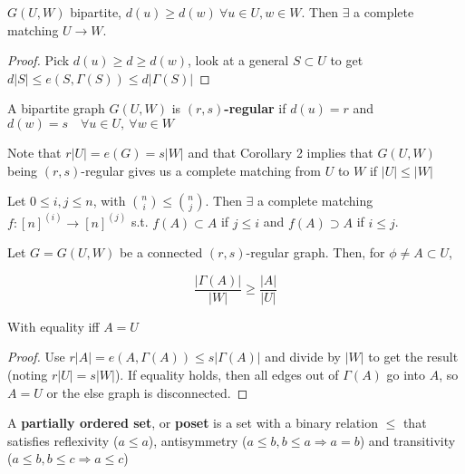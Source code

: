 \documentclass[a4paper]{article}
\begin{document}
{\begin{cor}[2]
	$G(U,W)$ bipartite, $d(u)\geq d(w)\ \forall u\in U, w\in W$. Then $\exists$ a complete matching $U\rightarrow W$.
\end{cor}
\begin{proof}
	Pick $d(u)\geq d\geq d(w)$, look at a general $S\subset U$ to get $d|S| \leq e(S, \Gamma(S)) \leq d|\Gamma(S)|$
\end{proof}


\begin{defi}[$(r,s)$-regular]
	A bipartite graph $G(U, W)$ is \textbf{$(r,s)$-regular} if $d(u)=r$ and $d(w)=s\quad\forall u\in U,\ \forall w\in W$
\end{defi}

Note that $r|U|=e(G)=s|W|$ and that Corollary 2 implies that $G(U, W)$ being $(r,s)$-regular gives us a complete matching from $U$ to $W$ if $|U|\leq |W|$

\begin{cor}[3]
	Let $0\leq i,j\leq n$, with $\binom{n}{i}\leq\binom{n}{j}$. Then $\exists$ a complete matching $f:[n]^{(i)}\rightarrow[n]^{(j)}$ s.t. $f(A)\subset A$ if $j\leq i$ and $f(A)\supset A$ if $i\leq j$.
\end{cor}

\begin{thm}[4]
	Let $G=G(U,W)$ be a connected $(r,s)$-regular graph. Then, for $\phi\neq A\subset U$,
	
	$$\frac{|\Gamma(A)|}{|W|}\geq \frac{|A|}{|U|}$$
	
	With equality iff $A=U$
\end{thm}
\begin{proof}
	Use $r|A|=e(A,\Gamma(A))\leq s|\Gamma(A)|$ and divide by $|W|$ to get the result (noting $r|U|=s|W|$). If equality holds, then all edges out of $\Gamma(A)$ go into $A$, so $A=U$ or the else graph is disconnected.
\end{proof}

\begin{defi}
	A \textbf{partially ordered set}, or \textbf{poset} is a set with a binary relation $\leq$ that satisfies reflexivity ($a\leq a$), antisymmetry ($a\leq b, b\leq a \Rightarrow a=b$) and transitivity ($a\leq b, b\leq c \Rightarrow a\leq c$)
\end{defi}

}
\end{document}
